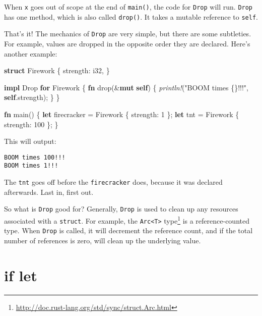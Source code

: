 \documentclass[a4paper,]{book}
\renewcommand*{\hypertarget}[3][\ar]{%
  \def\ar{#2}%
  \label{#1}%
  #3}
\newenvironment{Shaded}{\begin{snugshade}}{\end{snugshade}}
\newcommand{\KeywordTok}[1]{\textcolor[rgb]{0.13,0.29,0.53}{\textbf{{#1}}}}
\newcommand{\DataTypeTok}[1]{\textcolor[rgb]{0.13,0.29,0.53}{{#1}}}
\newcommand{\DecValTok}[1]{\textcolor[rgb]{0.00,0.00,0.81}{{#1}}}
\newcommand{\StringTok}[1]{\textcolor[rgb]{0.31,0.60,0.02}{{#1}}}
\newcommand{\BuiltInTok}[1]{{#1}}
\newcommand{\PreprocessorTok}[1]{\textcolor[rgb]{0.56,0.35,0.01}{\textit{{#1}}}}
\newcommand{\NormalTok}[1]{{#1}}
\renewcommand{\href}[2]{#2\footnote{\url{#1}}}
\begin{document}
When \texttt{x} goes out of scope at the end of \texttt{main()}, the
code for \texttt{Drop} will run. \texttt{Drop} has one method, which is
also called \texttt{drop()}. It takes a mutable reference to
\texttt{self}.

That's it! The mechanics of \texttt{Drop} are very simple, but there are
some subtleties. For example, values are dropped in the opposite order
they are declared. Here's another example:

\begin{Shaded}
\begin{Highlighting}[]
\KeywordTok{struct} \NormalTok{Firework \{}
    \NormalTok{strength: }\DataTypeTok{i32}\NormalTok{,}
\NormalTok{\}}

\KeywordTok{impl} \BuiltInTok{Drop} \KeywordTok{for} \NormalTok{Firework \{}
    \KeywordTok{fn} \NormalTok{drop(&}\KeywordTok{mut} \KeywordTok{self}\NormalTok{) \{}
        \PreprocessorTok{println!}\NormalTok{(}\StringTok{"BOOM times \{\}!!!"}\NormalTok{, }\KeywordTok{self}\NormalTok{.strength);}
    \NormalTok{\}}
\NormalTok{\}}

\KeywordTok{fn} \NormalTok{main() \{}
    \KeywordTok{let} \NormalTok{firecracker = Firework \{ strength: }\DecValTok{1} \NormalTok{\};}
    \KeywordTok{let} \NormalTok{tnt = Firework \{ strength: }\DecValTok{100} \NormalTok{\};}
\NormalTok{\}}
\end{Highlighting}
\end{Shaded}

This will output:

\begin{verbatim}
BOOM times 100!!!
BOOM times 1!!!
\end{verbatim}

The \texttt{tnt} goes off before the \texttt{firecracker} does, because
it was declared afterwards. Last in, first out.

So what is \texttt{Drop} good for? Generally, \texttt{Drop} is used to
clean up any resources associated with a \texttt{struct}. For example,
the
\href{http://doc.rust-lang.org/std/sync/struct.Arc.html}{\texttt{Arc\textless{}T\textgreater{}}
type} is a reference-counted type. When \texttt{Drop} is called, it will
decrement the reference count, and if the total number of references is
zero, will clean up the underlying value.

\hypertarget{sec--if-let}{\section{if let}\label{sec--if-let}}
\end{document}
